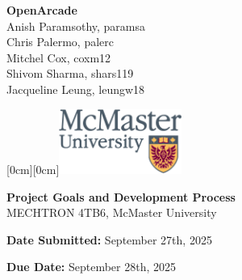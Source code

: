 \documentclass[a4]{article}
\date{\today}
\begin{document}
\begin{titlepage}

    \hspace*{0mm}\textbf{\Large OpenArcade}\\
    \hspace*{0mm} \large Anish Paramsothy, paramsa\\
    \hspace*{0mm} \large Chris Palermo, palerc\\
    \hspace*{0mm} \large Mitchel Cox, coxm12\\
    \hspace*{0mm} \large Shivom Sharma, shars119\\
    \hspace*{0mm} \large Jacqueline Leung, leungw18

    \hspace*{\textwidth} 
    \hspace{-4cm} 
    \vspace{-2cm} 
    \raisebox{1cm}[0cm][0cm]{\includegraphics[width=4cm]{m24-col_png.png}}

    \vspace{7cm} 
    
    
    \begin{center}
        \Huge \textbf{Project Goals and Development Process} \\[1em]
        \Large MECHTRON 4TB6, McMaster University
    \end{center}
    \vspace{7cm}
    
    \hspace*{0mm} \textbf{\large Date Submitted:} September 27th, 2025

    \hspace*{0mm} \textbf{\large Due Date:} September 28th, 2025
\end{titlepage}
\tableofcontents

\clearpage
\end{document}
